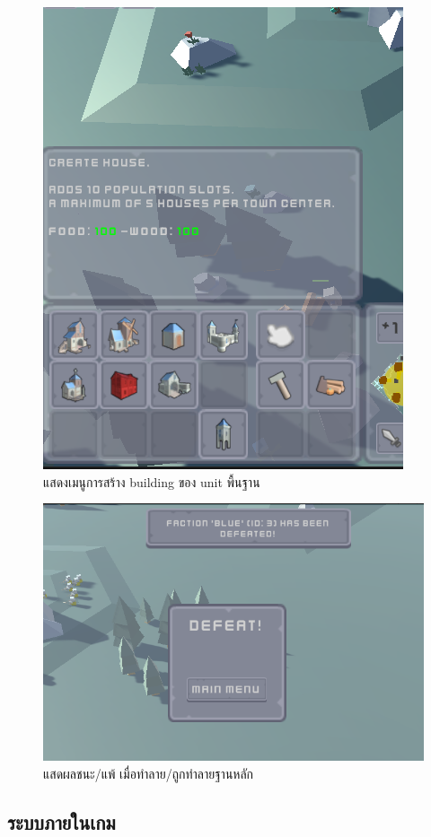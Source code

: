 \begin{figure}[ht]
  \centerline{\includegraphics[scale=.7]{createBuilding.png}}
  \caption{แสดงเมนูการสร้าง building ของ unit พื้นฐาน}
\end{figure}

\begin{figure}[h]
  \centerline{\includegraphics[scale=.6]{result.png}}
  \caption{แสดผลชนะ/แพ้ เมื่อทำลาย/ถูกทำลายฐานหลัก}
\end{figure}
\subsection{ระบบภายในเกม}

